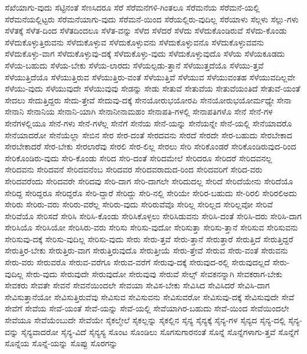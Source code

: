 {ಸೆಖೆಯಾಗು-ವುದು
ಸೆಟ್ಟಿನಂತೆ
ಸೆಣಸಿದರೂ
ಸೆರೆ
ಸೆರೆಮನೆಗಳಿ-ಗಿಂತಲೂ
ಸೆರೆಮನೆಯ
ಸೆರೆಮನೆ-ಯಲ್ಲಿ
ಸೆರೆಮನೆಯಲ್ಲಿಟ್ಟರು
ಸೆರೆಮನೆಯಾಗು-ವುದು
ಸೆರೆಮನೆ-ಯಿಂದ
ಸೆರೆಯಲ್ಲಿರು-ವುದಿಲ್ಲ
ಸೆರೆಯಾಳು
ಸೆಲ್ಗಳು
ಸೆಲ್ಲು-ಗಳು
ಸೆಳೆತಕ್ಕೆ
ಸೆಳೆತ-ದಿಂದ
ಸೆಳೆತದಿಂದಲೂ
ಸೆಳೆತ-ವನ್ನು
ಸೆಳೆದ
ಸೆಳೆದರೆ
ಸೆಳೆದು
ಸೆಳೆದುಕೊಂಡಿರುವೆ
ಸೆಳೆದು-ಕೊಂಡು
ಸೆಳೆದುಕೊಳ್ಳುತ್ತಿರುವನು
ಸೆಳೆದುಕೊಳ್ಳುವ
ಸೆಳೆದುಕೊಳ್ಳುವನು
ಸೆಳೆದುಕೊಳ್ಳುವನೊ
ಸೆಳೆದುಕೊಳ್ಳುವವನು
ಸೆಳೆದುಕೊಳ್ಳು-ವಾಗ
ಸೆಳೆದುಕೊಳ್ಳುವು-ದಕ್ಕೆ
ಸೆಳೆದುಕೊಳ್ಳು-ವುದು
ಸೆಳೆದುಕೊಳ್ಳುವುದೊ
ಸೆಳೆಯ
ಸೆಳೆಯಕೂಡದು
ಸೆಳೆಯ-ಬಹುದು
ಸೆಳೆಯ-ಬೇಕು
ಸೆಳೆಯ-ಲಾರದು
ಸೆಳೆಯಲ್ಪಡು-ತ್ತಾನೆ
ಸೆಳೆಯುತ್ತದೆಯೊ
ಸೆಳೆಯು-ತ್ತವೆ
ಸೆಳೆಯುತ್ತಿದೆಯೊ
ಸೆಳೆಯುತ್ತಿರುವ
ಸೆಳೆಯುತ್ತಿರು-ವಂತೆ
ಸೆಳೆಯುತ್ತಿವೆ
ಸೆಳೆಯುವ
ಸೆಳೆಯುವಂತಹ
ಸೆಳೆಯುವದಿಲ್ಲವೇ
ಸೆಳೆಯು-ವುದು
ಸೆಳೆಯುವುದೇ
ಸೆಳೆಯುವುವು
ಸೇಡನ್ನು
ಸೇಡು
ಸೇತುವೆ
ಸೇತುವೆಯ
ಸೇತುವೆಯಂತಿದೆ
ಸೇತುವೆ-ಯಂತೆ
ಸೇದಲು
ಸೇದುತ್ತಿದ್ದರು
ಸೇದು-ತ್ತೇವೆ
ಸೇದುವು-ದಕ್ಕೆ
ಸೇನಯೋರುಭಯೋರಪಿ
ಸೇನಯೋರುಭಯೋರ್ಮಧ್ಯೇ
ಸೇನಾ
ಸೇನಾನಿ
ಸೇನಾನಿಯ
ಸೇನಾನಿ-ಯಾಗಿ
ಸೇನಾನೀನಾಮಹಂ
ಸೇನಾಪತಿ-ಗಳಲ್ಲಿ
ಸೇನಾಪತಿಗಳೊ
ಸೇನೆ
ಸೇನೆ-ಗಳ
ಸೇನೆಗಳಲ್ಲಿಯೂ
ಸೇನೆ-ಗಳು
ಸೇನೆ-ಗಳೆಲ್ಲ
ಸೇನೆಗೆ
ಸೇನೆಯ
ಸೇನೆ-ಯನ್ನು
ಸೇನೆಯನ್ನೇ
ಸೇನೆ-ಯಲ್ಲಿ
ಸೇನೆಯಾದರೊ
ಸೇನೆಯಾದರೋ
ಸೇನೆಯೆಲ್ಲಾ
ಸೇಬಿನ
ಸೇರ
ಸೇರ-ದಂತೆ
ಸೇರದವನು
ಸೇರದೆ
ಸೇರದೇ
ಸೇರ-ಬಹುದು
ಸೇರಬೇಕಾದ
ಸೇರಬೇಕಾದರೆ
ಸೇರ-ಬೇಕು
ಸೇರಲಾರೆವು
ಸೇರಲಿ
ಸೇರ-ಲಿಲ್ಲ
ಸೇರಲು
ಸೇರಿ
ಸೇರಿಕೊಂಡರೆ
ಸೇರಿಕೊಂಡಿರುವುದ-ರಿಂದ
ಸೇರಿಕೊಂಡಿರು-ವುದು
ಸೇರಿ-ಕೊಂಡು
ಸೇರಿದ
ಸೇರಿ-ದಂತೆ
ಸೇರಿದಮೇಲೆ
ಸೇರಿದರೂ
ಸೇರಿದರೆ
ಸೇರಿದವನಲ್ಲ
ಸೇರಿದವನು
ಸೇರಿದವನೆ
ಸೇರಿದವನೆಂಬ
ಸೇರಿದವರ
ಸೇರಿದವರಾದುದ-ರಿಂದ
ಸೇರಿದವರಿಗೆ
ಸೇರಿದ-ವರು
ಸೇರಿದವರೆಂದು
ಸೇರಿದವರೇ
ಸೇರಿದವು
ಸೇರಿ-ದಾಗ
ಸೇರಿ-ದಾಗಲೇ
ಸೇರಿದುದಲ್ಲ
ಸೇರಿದೆ
ಸೇರಿದೆಯೇನು
ಸೇರಿದೆಯೊ
ಸೇರಿದ್ದ
ಸೇರಿದ್ದರೂ
ಸೇರಿದ್ದರೊ
ಸೇರಿ-ದ್ದಾರೆ
ಸೇರಿದ್ದು
ಸೇರಿ-ನಲ್ಲಿ
ಸೇರಿಯೇ
ಸೇರಿರ-ಬಹುದು
ಸೇ-ರಿರಲಿ
ಸೇರಿರಲಿಅದು
ಸೇರಿರು
ಸೇರಿರು-ವರು
ಸೇರಿರು-ವರೆಲ್ಲ
ಸೇರಿರು-ವುದು
ಸೇರಿರುವೆವೊ
ಸೇರಿಲ್ಲ
ಸೇರಿಲ್ಲದ
ಸೇರಿಲ್ಲವೋ
ಸೇರಿವೆ
ಸೇರಿವೆಯೊ
ಸೇರಿಸದೆ
ಸೇರಿಸಿ
ಸೇರಿಸಿ-ಕೊಂಡು
ಸೇರಿಸಿಕೊಳ್ಳಲು
ಸೇರಿಸಿಡುವನು
ಸೇರಿಸಿ-ದಂತೆ
ಸೇರಿಸಿ-ದರು
ಸೇರಿಸಿ-ದಾಗ
ಸೇರಿಸಿಯೊ
ಸೇರಿಸಿಯೋ
ಸೇರಿಸಿರು-ವರು
ಸೇರಿಸು
ಸೇರಿಸು-ವುದೋ
ಸೇರಿಸುತ್ತಾ
ಸೇರಿಸು-ತ್ತಾನೆ
ಸೇರಿಸುವ
ಸೇರಿಸುವನು
ಸೇರಿಸುವು-ದಕ್ಕೆ
ಸೇರಿಸು-ವುದಿಲ್ಲ
ಸೇರಿಸು-ವುದು
ಸೇರು
ಸೇರು-ತ್ತವೆ
ಸೇರು-ತ್ತಾನೆ
ಸೇರುತ್ತಾರೆ
ಸೇರುತ್ತಿದೆ
ಸೇರುತ್ತಿದ್ದರೆ
ಸೇರುತ್ತಿರ-ಬೇಕು
ಸೇರುತ್ತಿರು-ವಾಗ
ಸೇರುತ್ತಿರುವುದೊ
ಸೇರುತ್ತೀಯೆ
ಸೇರು-ತ್ತೇವೆ
ಸೇರುವ
ಸೇರು-ವಂತೆ
ಸೇರುವನು
ಸೇರು-ವರು
ಸೇರುವರೊ
ಸೇರುವ-ವರೆಗೂ
ಸೇರುವ-ವರೆಗೆ
ಸೇರುವು-ದಕ್ಕೆ
ಸೇರುವುದ-ರಲ್ಲಿ
ಸೇರುವುದಲ್ಲದೆ
ಸೇರು-ವುದಿಲ್ಲ
ಸೇರು-ವುದು
ಸೇರುವುದೇ
ಸೇರುವುದೋ
ಸೇರುವುವು
ಸೇರುವೆ
ಸೇಲ್ಸ್
ಸೇವಕನನ್ನಾಗಿ
ಸೇವಕರಾಗ-ಬೇಕು
ಸೇವಕರು
ಸೇವತೇ
ಸೇವನೆ
ಸೇವನೆಯಿಂದಲೇ
ಸೇವಯಾ
ಸೇವಿಸ-ಬೇಕು
ಸೇವಿಸಿದ
ಸೇವಿಸಿದರೆ
ಸೇವಿಸಿ-ದಾಗ
ಸೇವಿಸುತ್ತಾನೆಯೋ
ಸೇವಿಸುತ್ತಿರುವೆವು
ಸೇವಿಸುವ
ಸೇವಿಸುವನು
ಸೇವಿಸುವರೋ
ಸೇವಿಸುವು-ದಕ್ಕೆ
ಸೇವಿಸುವುದೇ
ಸೇವೆ
ಸೇವೆಗೆ
ಸೇವೆಯ
ಸೇವೆ-ಯಂತೆ
ಸೇವೆ-ಯನ್ನು
ಸೇವೆ-ಯಲ್ಲಿ
ಸೇವೆಯಾಗಿರ-ಬಹುದು
ಸೇವೆ-ಯಿಂದ
ಸೇವೆಯಿಂದಲೇ
ಸೇವೆಯೂ
ಸೇವೆಯೆಂಬುದೇ
ಸೇವೆಯೇ
ಸೈಕಲ್ಮೇಲೆ
ಸೈಕಲ್ಲನ್ನು
ಸೈಕಲ್ಲಿನ
ಸೈನ್ಯ
ಸೈನ್ಯಕ್ಕೆ
ಸೈನ್ಯ-ಗಳ
ಸೈನ್ಯದ
ಸೈನ್ಯ-ದಲ್ಲಿ
ಸೈನ್ಯ-ವನ್ನು
ಸೈನ್ಯವಾದರೋ
ಸೈನ್ಯ-ವಿದೆ
ಸೈನ್ಯಸ್ಯ
ಸೊಂಟ
ಸೊಂಡಿಲು
ಸೊಗಸುಗಾರನಂತೆ
ಸೊನ್ನೆ
ಸೊನ್ನೆಗಳಾಗು-ತ್ತವೆ
ಸೊನ್ನೆಗೆ
ಸೊನ್ನೆಯ
ಸೊನ್ನೆ-ಯನ್ನು
ಸೊಪ್ಪು
ಸೊರಗನ್ನು
}
